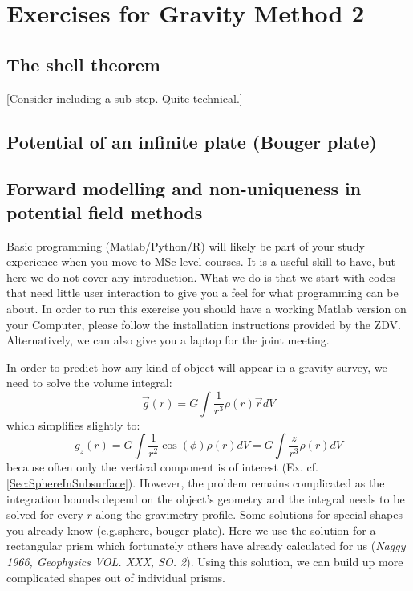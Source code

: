 \documentclass[a4paper,12pt]{article}
\begin{document}
\section{Exercises for Gravity Method 2}
\subsection{The shell theorem}
\label{Sec:Shell{}}
[Consider including a sub-step. Quite technical.]
\pagebreak




\subsection{Potential of an infinite plate (Bouger plate)}
\pagebreak


\subsection{Forward modelling and non-uniqueness in potential field methods}
\begin{tcolorbox}[enhanced jigsaw,breakable,pad at break*=1mm,
  colback=blue!5!white,colframe=burgundy,title=Matlab (or Python),
  watermark color=white]
  Basic programming (Matlab/Python/R) will  likely be part of your study experience when you move to MSc level courses. It is a useful skill to have, but here we do not cover any introduction. What we do is that we start with codes that need  little user interaction to give you a feel for what programming can be about. In order to run this exercise you should have a working Matlab version on your Computer, please follow the installation instructions provided by the ZDV. Alternatively, we can also give you a laptop for the joint meeting.
\end{tcolorbox}
\label{Sec:GravityForwardModelling}
In order to predict how any kind of object will appear in a gravity survey, we need to solve the volume integral:
$$
 \vec{g}(r) = G\int \frac{1}{r^3} \rho(r) \vec{r} dV 
$$
which simplifies slightly to:
$$
 g_z(r) = G\int \frac{1}{r^2} \cos(\phi)\rho(r) dV = G\int \frac{z}{r^3} \rho(r) dV
$$
because often only the vertical component is of interest (Ex. cf. \ref{Sec:SphereInSubsurface}).
However, the problem remains complicated as the integration bounds depend on the object's geometry and the integral needs to be solved for every $r$ along the gravimetry profile. Some solutions for special shapes you already know (e.g.sphere, bouger plate). Here we use the solution for a rectangular prism which fortunately others have already calculated for us (\textit{Naggy 1966, Geophysics VOL. XXX, SO. 2}). Using this solution, we can build up more complicated shapes out of individual prisms.
\end{document}
